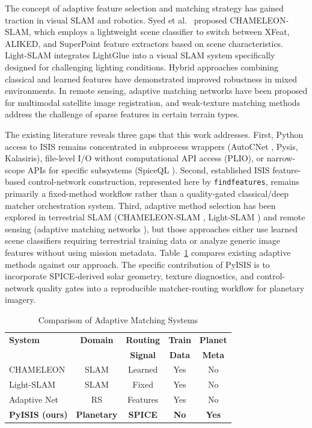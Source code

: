 \documentclass[lettersize,journal]{IEEEtran}
\newcommand{\pyisis}{PyISIS}
\begin{document}
The concept of adaptive feature selection and matching strategy has gained traction in visual SLAM and robotics. Syed et al.\ \cite{syed2026chameleon} proposed CHAMELEON-SLAM, which employs a lightweight scene classifier to switch between XFeat, ALIKED, and SuperPoint feature extractors based on scene characteristics. Light-SLAM \cite{lightslam2024} integrates LightGlue into a visual SLAM system specifically designed for challenging lighting conditions. Hybrid approaches combining classical and learned features \cite{hybrid2026} have demonstrated improved robustness in mixed environments. In remote sensing, adaptive matching networks \cite{adaptive2023} have been proposed for multimodal satellite image registration, and weak-texture matching methods \cite{weaktexture2023} address the challenge of sparse features in certain terrain types.

The existing literature reveals three gaps that this work addresses. First, Python access to ISIS remains concentrated in subprocess wrappers (AutoCNet \cite{laura2018autocnet}, Pysis, Kalasiris), file-level I/O without computational API access (PLIO), or narrow-scope APIs for specific subsystems (SpiceQL \cite{usgs2024spiceql}). Second, established ISIS feature-based control-network construction, represented here by \texttt{findfeatures}, remains primarily a fixed-method workflow rather than a quality-gated classical/deep matcher orchestration system. Third, adaptive method selection has been explored in terrestrial SLAM (CHAMELEON-SLAM \cite{syed2026chameleon}, Light-SLAM \cite{lightslam2024}) and remote sensing (adaptive matching networks \cite{adaptive2023}), but those approaches either use learned scene classifiers requiring terrestrial training data or analyze generic image features without using mission metadata. Table~\ref{tab:adaptive_comparison} compares existing adaptive methods against our approach. The specific contribution of \pyisis{} is to incorporate SPICE-derived solar geometry, texture diagnostics, and control-network quality gates into a reproducible matcher-routing workflow for planetary imagery.

\begin{table}[htbp]
\caption{Comparison of Adaptive Matching Systems}
\label{tab:adaptive_comparison}
\centering
\small
\begin{tabular}{@{}lcccc@{}}
\toprule
\textbf{System} & \textbf{Domain} & \textbf{Routing} & \textbf{Train} & \textbf{Planet} \\
 &  & \textbf{Signal} & \textbf{Data} & \textbf{Meta} \\
\midrule
CHAMELEON \cite{syed2026chameleon} & SLAM & Learned & Yes & No \\
Light-SLAM \cite{lightslam2024} & SLAM & Fixed & Yes & No \\
Adaptive Net \cite{adaptive2023} & RS & Features & Yes & No \\
\textbf{PyISIS (ours)} & \textbf{Planetary} & \textbf{SPICE} & \textbf{No} & \textbf{Yes} \\
\bottomrule
\end{tabular}
\end{table}
\end{document}

